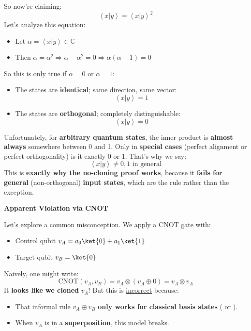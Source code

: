 So now're claiming:
\begin{equation*}
    \left\langle x | y \right\rangle = \left\langle x | y \right\rangle^{2}
\end{equation*}
Let's analyze this equation:
\begin{itemize}
    \item Let $\alpha = \left\langle x | y \right\rangle \in \mathbb{C}$
    \item Then $\alpha = \alpha^{2} \Rightarrow \alpha-\alpha^{2} = 0 \Rightarrow \alpha\left(\alpha - 1\right) = 0$
\end{itemize}
So this is only true if $\alpha = 0$ or $\alpha = 1$:
\begin{itemize}
    \item The states are \textbf{identical}; same direction, same vector:
    \begin{equation*}
        \left\langle x | y \right\rangle = 1
    \end{equation*}
    \item The states are \textbf{orthogonal}; completely distinguishable:
    \begin{equation*}
        \left\langle x | y \right\rangle = 0
    \end{equation*}
\end{itemize}
Unfortunately, for \textbf{arbitrary quantum states}, the inner product is \textbf{almost always} somewhere between 0 and 1. Only in \textbf{special cases} (perfect alignment or perfect orthogonality) is it exactly 0 or 1. That's why we say:
\begin{equation*}
    \left\langle x | y \right\rangle \ne 0,1 \text{ in general}
\end{equation*}
This is \textbf{exactly why the no-cloning proof works}, because it \textbf{fails for general} (non-orthogonal) \textbf{input states}, which are the rule rather than the exception.

\highspace
\begin{flushleft}
    \textcolor{Red2}{ \textbf{Apparent Violation via CNOT}}
\end{flushleft}
Let's explore a common misconception. We apply a CNOT gate with:
\begin{itemize}
    \item Control qubit $v_{A} = a_{0}\ket{0} + a_{1}\ket{1}$
    \item Target qubit $v_{B} = \ket{0}$
\end{itemize}
Naively, one might write:
\begin{equation*}
    \text{CNOT}\left(v_{A}, v_{B}\right) = v_{A} \otimes \left(v_{A} \oplus 0\right) = v_{A} \otimes v_{A}
\end{equation*}
It \textbf{looks like we cloned} $v_{A}$! But this is \underline{incorrect} because:
\begin{itemize}
    \item That informal rule $v_{A} \oplus v_{B}$ \textbf{only works for classical basis states} ( or ).
    \item When $v_{A}$ is in a \textbf{superposition}, this model breaks.
\end{itemize}

